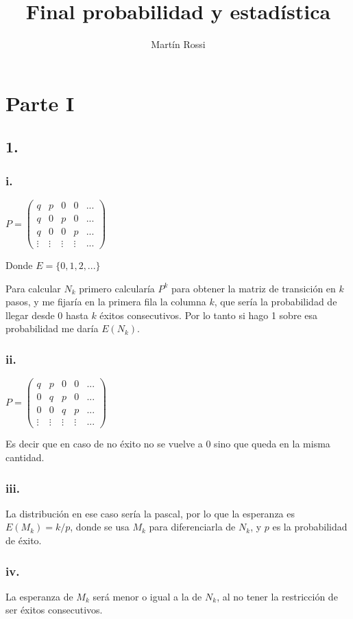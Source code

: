 \documentclass[12pt,fleqn]{article}
\title{\LARGE Final probabilidad y estadística}
\author{Martín Rossi}
\date{}
\begin{document}
\maketitle
\section*{Parte I}
\subsection*{1.}
\subsubsection*{i.}
$P=\begin{pmatrix}
  q&p&0&0&...\\
  q&0&p&0&...\\
  q&0&0&p&...\\
  \vdots&\vdots&\vdots&\vdots&...
\end{pmatrix}$

Donde $E=\{0,1,2,...\}$

Para calcular $N_k$ primero calcularía $P^k$ para obtener la matriz de transición en $k$ pasos, y me fijaría en la primera fila la columna $k$, que sería la probabilidad de llegar desde 0 hasta $k$ éxitos consecutivos. Por lo tanto si hago 1 sobre esa probabilidad me daría $E(N_k)$.
\subsubsection*{ii.}
$P=\begin{pmatrix}
  q&p&0&0&...\\
  0&q&p&0&...\\
  0&0&q&p&...\\
  \vdots&\vdots&\vdots&\vdots&...
\end{pmatrix}$

Es decir que en caso de no éxito no se vuelve a 0 sino que queda en la misma cantidad.
\subsubsection*{iii.}
La distribución en ese caso sería la pascal, por lo que la esperanza es $E(M_k)=k/p$, donde se usa $M_k$ para diferenciarla de $N_k$, y $p$ es la probabilidad de éxito.
\subsubsection*{iv.}
La esperanza de $M_k$ será menor o igual a la de $N_k$, al no tener la restricción de ser éxitos consecutivos.
\end{document}
